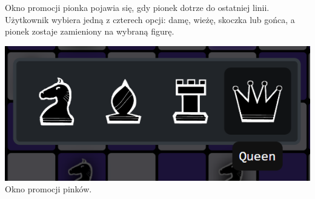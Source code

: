 \documentclass[12pt,a4paper]{article}
\begin{document}
\vspace{1cm}

\begin{minipage}[t]{0.55\textwidth} 
    \vspace{0pt} 
    \justifying 
    \noindent 
    Okno promocji pionka pojawia się, gdy pionek dotrze do ostatniej linii. Użytkownik wybiera jedną z czterech opcji: damę, wieżę, skoczka lub gońca, a pionek zostaje zamieniony na wybraną figurę.
\end{minipage} 
\hfill 
\begin{minipage}[t]{0.35\textwidth} 
    \vspace{0pt} 
    \centering 
    \includegraphics[width=\linewidth]{images/ins_min_prom.png} 
    Okno promocji pinków.
\end{minipage}

\vspace{1cm}
\end{document}

